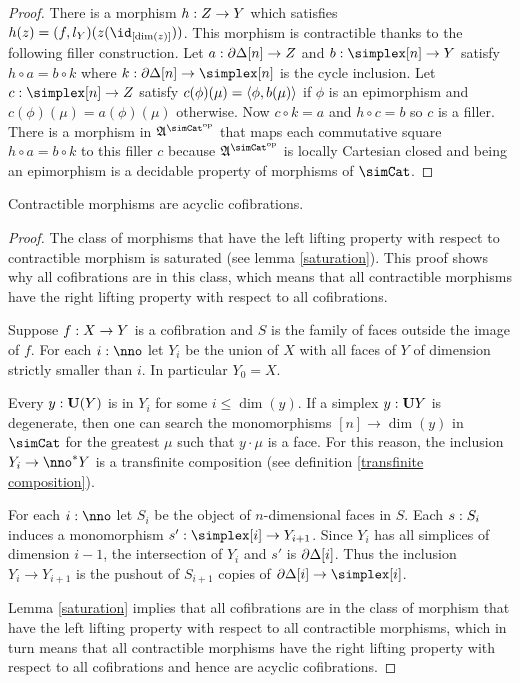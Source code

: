 \documentclass[csh.tex]{subfiles}
\begin{document}
\begin{proof}
There is a morphism $h: Z\to Y$ which satisfies $h(z) = (f,l_Y)(z(\id_{[\dim(z)]}))$. This morphism is contractible thanks to the following filler construction. Let $a: \partial\Delta[n]\to Z$ and $b\of \simplex[n]\to Y$ satisfy $h\circ a = b\circ k$ where $k\of\cycle[n]\to\simplex[n]$ is the cycle inclusion. Let $c\of \simplex[n]\to Z$ satisfy $c(\phi)(\mu) = \left\langle \phi,b(\mu) \right\rangle$ if $\phi$ is an epimorphism and $c(\phi)(\mu) = a(\phi)(\mu)$ otherwise. Now $c\circ k = a$ and $h\circ c = b$ so $c$ is a filler. There is a morphism in $\ambient\s$ that maps each commutative square $h\circ a = b\circ k$ to this filler $c$ because $\ambient\s$ is locally Cartesian closed and being an epimorphism is a decidable property of morphisms of $\simCat$.
\end{proof}

\begin{lemma} Contractible morphisms are acyclic cofibrations.\label{Reedy}\end{lemma}

\begin{proof} The class of morphisms that have the left lifting property with respect to contractible morphism is saturated (see lemma \ref{saturation}). This proof shows why all cofibrations are in this class, which means that all contractible morphisms have the right lifting property with respect to all cofibrations.

Suppose $f: X\to Y$ is a cofibration and $S$ is the family of faces outside the image of $f$. For each $i\of\nno$ let $Y_i$ be the union of $X$ with all faces of $Y$ of dimension strictly smaller than $i$. In particular $Y_0=X$.

Every $y:\mathbf{U}(Y)$ is in $Y_i$ for some $i\leq \dim(y)$. If a simplex $y:\mathbf{U} Y$ is degenerate, then one can search the monomorphisms $[n]\to\dim(y)$ in $\simCat$ for the greatest $\mu$ such that $y\cdot\mu$ is a face. For this reason, the inclusion $Y_i\to\nno\ri Y$ is a transfinite composition (see definition \ref{transfinite composition}).

For each $i\of\nno$ let $S_i$ be the object of $n$-dimensional faces in $S$. Each $s: S_i$ induces a monomorphism $s'\of\simplex[i]\to Y_{i+1}$. Since $Y_{i}$ has all simplices of dimension $i-1$, the intersection of $Y_i$ and $s'$ is $\partial\Delta[i]$. Thus the inclusion $Y_i\to Y_{i+1}$ is the pushout of $S_{i+1}$ copies of $\cycle[i]\to\simplex[i]$.

Lemma \ref{saturation} implies that all cofibrations are in the class of morphism that have the left lifting property with respect to all contractible morphisms, which in turn means that all contractible morphisms have the right lifting property with respect to all cofibrations and hence are acyclic cofibrations.
\end{proof}
\end{document}
